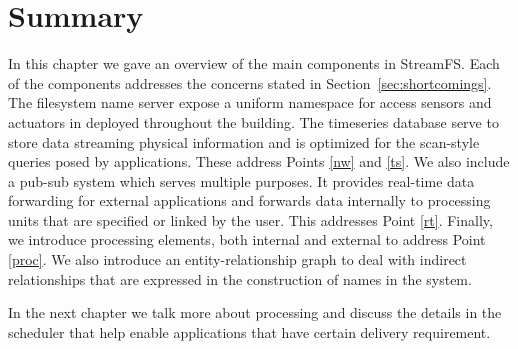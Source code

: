 \section{Summary}


In this chapter we gave an overview of the main components in StreamFS.  Each of the components addresses the concerns stated in 
Section~\ref{sec:shortcomings}.  The filesystem name server expose a uniform namespace for access sensors and actuators in 
deployed throughout the building.  The timeseries database serve to store data streaming physical information and 
is optimized for the scan-style queries posed by applications.  These address Points \ref{nw} and \ref{ts}.
We also include a pub-sub system which serves multiple purposes.  It provides real-time data forwarding for external
applications and forwards data internally to processing units that are specified or linked by the user.
This addresses Point \ref{rt}.  Finally, we introduce processing elements, both internal and external to address
Point \ref{proc}.  We also introduce an entity-relationship graph to deal with indirect relationships that are
expressed in the construction of names in the system.

In the next chapter we talk more about processing and discuss the details in the scheduler that help enable applications
that have certain delivery requirement.
